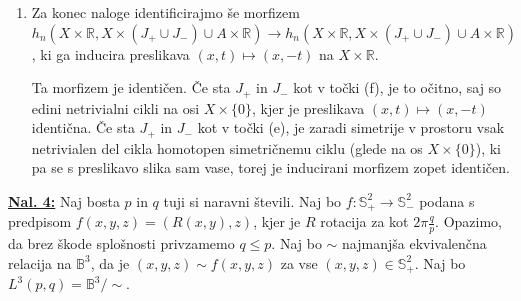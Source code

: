 \documentclass[a4paper, 12pt]{article}
\renewcommand{\S}{\mathbb{S}}
\newcommand{\B}{\mathbb{B}}
\newcommand{\R}{\mathbb{R}}
\begin{document}
\begin{enumerate}[label=(\alph*)]
	\item Za konec naloge identificirajmo še morfizem $h_n(X\times\R, X\times (J_+ \cup J_-) \cup A \times \R) \to h_n(X\times\R, X\times (J_+ \cup J_-) \cup A\times\R)$, ki ga inducira preslikava $(x, t) \mapsto (x, -t)$ na $X\times\R$.
	
	Ta morfizem je identičen. Če sta $J_+$ in $J_-$ kot v točki (f), je to očitno, saj so edini netrivialni cikli na osi $X \times \lbrace 0 \rbrace$, kjer je preslikava $(x, t) \mapsto (x, -t)$ identična. Če sta $J_+$ in $J_-$ kot v točki (e), je zaradi simetrije v prostoru vsak netrivialen del cikla homotopen simetričnemu ciklu (glede na os $X\times\lbrace 0 \rbrace$), ki pa se s preslikavo slika sam vase, torej je inducirani morfizem zopet identičen.
\end{enumerate}

\underline{\textbf{Nal. 4:}}
Naj bosta $p$ in $q$ tuji si naravni števili. Naj bo $f\colon\S^2_+ \to \S^2_-$ podana s predpisom $f(x, y, z) = (R(x, y), z)$, kjer je $R$ rotacija za kot $2\pi\frac{q}{p}$. Opazimo, da brez škode splošnosti privzamemo $q \leq p$. Naj bo $\sim$ najmanjša ekvivalenčna relacija na $\B^3$, da je $(x, y, z) \sim f(x, y, z)$ za vse $(x, y, z) \in \S^2_+$. Naj bo $L^3(p, q) = \B^3 / \sim$.
\end{document}
